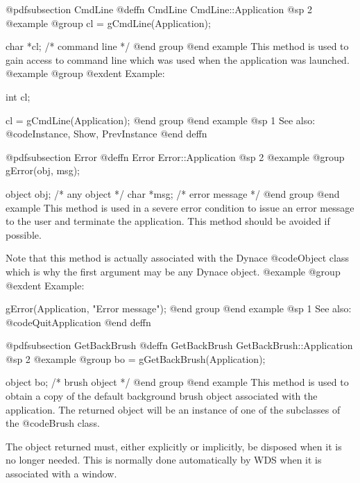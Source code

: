 @pdfsubsection {CmdLine}
@deffn {CmdLine} CmdLine::Application
@sp 2
@example
@group
cl = gCmdLine(Application);

char    *cl;    /*  command line   */
@end group
@end example
This method is used to gain access to command line which was used when
the application was launched.
@example
@group
@exdent Example:

int     cl;

cl = gCmdLine(Application);
@end group
@end example
@sp 1
See also:  @code{Instance, Show, PrevInstance}
@end deffn















@pdfsubsection {Error}
@deffn {Error} Error::Application
@sp 2
@example
@group
gError(obj, msg);

object  obj;    /*  any object     */
char    *msg;   /*  error message  */
@end group
@end example
This method is used in a severe error condition to issue an error message
to the user and terminate the application.  This method should be avoided
if possible.

Note that this method is actually associated with the Dynace @code{Object}
class which is why the first argument may be any Dynace object.
@example
@group
@exdent Example:

gError(Application, "Error message");
@end group
@end example
@sp 1
See also:  @code{QuitApplication}
@end deffn












@pdfsubsection {GetBackBrush}
@deffn {GetBackBrush} GetBackBrush::Application
@sp 2
@example
@group
bo = gGetBackBrush(Application);

object  bo;     /*  brush object  */
@end group
@end example
This method is used to obtain a copy of the default background brush
object associated with the application.  The returned object will be an
instance of one of the subclasses of the @code{Brush} class.

The object returned must, either explicitly or implicitly, be
disposed when it is no longer needed.  This is normally done
automatically by WDS when it is associated with a window.

